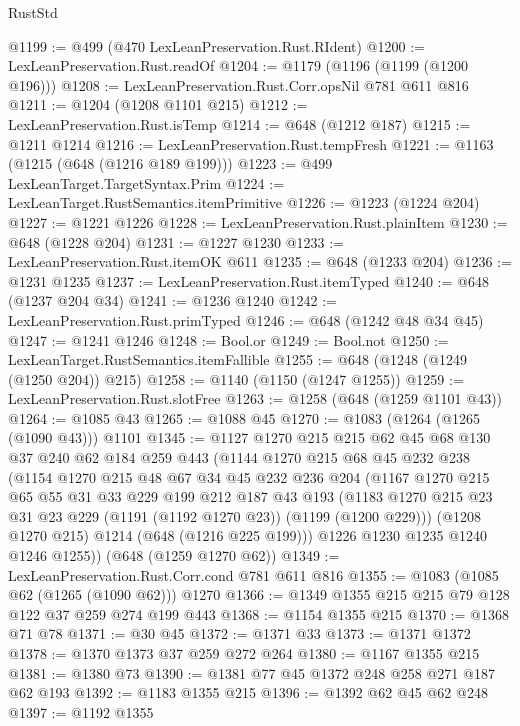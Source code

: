 \begin{lexlean}{RustStd}
\begin{coremodule}
@1199 := @499 (@470 LexLeanPreservation.Rust.RIdent)
@1200 := LexLeanPreservation.Rust.readOf
@1204 := @1179 (@1196 (@1199 (@1200 @196)))
@1208 := LexLeanPreservation.Rust.Corr.opsNil @781 @611 @816
@1211 := @1204 (@1208 @1101 @215)
@1212 := LexLeanPreservation.Rust.isTemp
@1214 := @648 (@1212 @187)
@1215 := @1211 @1214
@1216 := LexLeanPreservation.Rust.tempFresh
@1221 := @1163 (@1215 (@648 (@1216 @189 @199)))
@1223 := @499 LexLeanTarget.TargetSyntax.Prim
@1224 := LexLeanTarget.RustSemantics.itemPrimitive
@1226 := @1223 (@1224 @204)
@1227 := @1221 @1226
@1228 := LexLeanPreservation.Rust.plainItem
@1230 := @648 (@1228 @204)
@1231 := @1227 @1230
@1233 := LexLeanPreservation.Rust.itemOK @611
@1235 := @648 (@1233 @204)
@1236 := @1231 @1235
@1237 := LexLeanPreservation.Rust.itemTyped
@1240 := @648 (@1237 @204 @34)
@1241 := @1236 @1240
@1242 := LexLeanPreservation.Rust.primTyped
@1246 := @648 (@1242 @48 @34 @45)
@1247 := @1241 @1246
@1248 := Bool.or
@1249 := Bool.not
@1250 := LexLeanTarget.RustSemantics.itemFallible
@1255 := @648 (@1248 (@1249 (@1250 @204)) @215)
@1258 := @1140 (@1150 (@1247 @1255))
@1259 := LexLeanPreservation.Rust.slotFree
@1263 := @1258 (@648 (@1259 @1101 @43))
@1264 := @1085 @43
@1265 := @1088 @45
@1270 := @1083 (@1264 (@1265 (@1090 @43))) @1101
@1345 := @1127
    @1270
    @215
    @215
    @62
    @45
    @68
    @130
    @37
    @240
    @62
    @184
    @259
    @443
    (@1144
      @1270
      @215
      @68
      @45
      @232
      @238
      (@1154
        @1270
        @215
        @48
        @67
        @34
        @45
        @232
        @236
        @204
        (@1167
          @1270
          @215
          @65
          @55
          @31
          @33
          @229
          @199
          @212
          @187
          @43
          @193
          (@1183 @1270 @215 @23 @31 @23 @229 (@1191 (@1192 @1270 @23)) (@1199 (@1200 @229)))
          (@1208 @1270 @215)
          @1214
          (@648 (@1216 @225 @199)))
        @1226
        @1230
        @1235
        @1240
        @1246
        @1255))
    (@648 (@1259 @1270 @62))
@1349 := LexLeanPreservation.Rust.Corr.cond @781 @611 @816
@1355 := @1083 (@1085 @62 (@1265 (@1090 @62))) @1270
@1366 := @1349 @1355 @215 @215 @79 @128 @122 @37 @259 @274 @199 @443
@1368 := @1154 @1355 @215
@1370 := @1368 @71 @78
@1371 := @30 @45
@1372 := @1371 @33
@1373 := @1371 @1372
@1378 := @1370 @1373 @37 @259 @272 @264
@1380 := @1167 @1355 @215
@1381 := @1380 @73
@1390 := @1381 @77 @45 @1372 @248 @258 @271 @187 @62 @193
@1392 := @1183 @1355 @215
@1396 := @1392 @62 @45 @62 @248
@1397 := @1192 @1355

\end{coremodule}
\end{lexlean}
